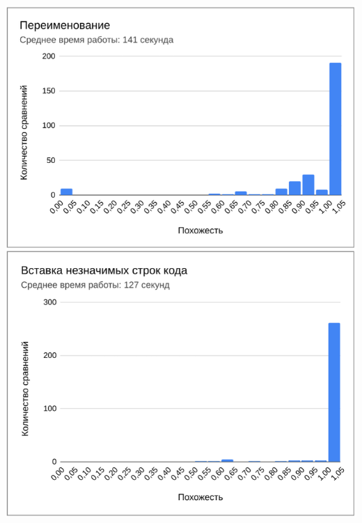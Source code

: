 \documentclass[10pt]{beamer}
\begin{document}
\begin{frame}
\begin{columns}
		\centering
		\includegraphics[scale=0.52]{res2.png}
		
	\end{columns}
	
\end{frame}
\end{document}
